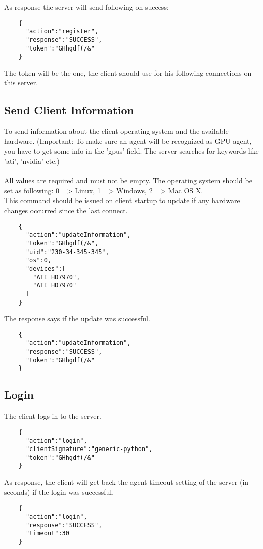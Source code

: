 \documentclass{article}
\begin{document}
	\noindent As response the server will send following on success:
	\begin{verbatim}
	{
	  "action":"register",
	  "response":"SUCCESS",
	  "token":"GHhgdf(/&"
	} 
	\end{verbatim}
	The token will be the one, the client should use for his following connections on this server.
	
	\subsection*{Send Client Information}
	To send information about the client operating system and the available hardware. (Important: To make sure an agent will be recognized as GPU agent, you have to get some info in the 'gpus' field. The server searches for keywords like 'ati', 'nvidia' etc.)\\ \\
	All values are required and must not be empty. The operating system should be set as following: 0 => Linux, 1 => Windows, 2 => Mac OS X.\\
	This command should be issued on client startup to update if any hardware changes occurred since the last connect.
	\begin{verbatim}
	{
	  "action":"updateInformation",
	  "token":"GHhgdf(/&",
	  "uid":"230-34-345-345",
	  "os":0,
	  "devices":[
	    "ATI HD7970",
	    "ATI HD7970"
	  ]
	}
	\end{verbatim}
	
	\noindent The response says if the update was successful.
	\begin{verbatim}
	{
	  "action":"updateInformation",
	  "response":"SUCCESS",
	  "token":"GHhgdf(/&"
	} 
	\end{verbatim}
	
	\subsection*{Login}
	The client logs in to the server.
	\begin{verbatim}
	{
	  "action":"login",
	  "clientSignature":"generic-python",
	  "token":"GHhgdf(/&"
	}
	\end{verbatim}
	As response, the client will get back the agent timeout setting of the server (in seconds) if the login
	was successful.
	\begin{verbatim}
	{
	  "action":"login",
	  "response":"SUCCESS",
	  "timeout":30
	}
	\end{verbatim}
	
\end{document}
